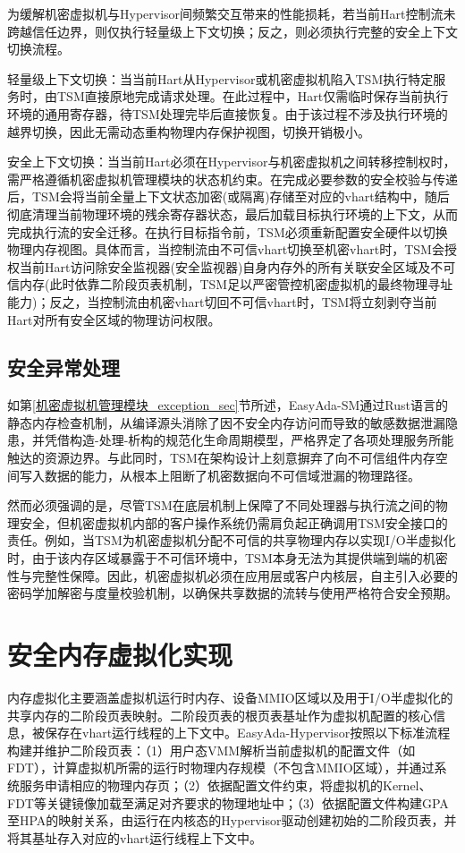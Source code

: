\documentclass[master, vlined, review]{DissertUESTC}
\begin{document}
	为缓解机密虚拟机与Hypervisor间频繁交互带来的性能损耗，若当前Hart控制流未跨越信任边界，则仅执行轻量级上下文切换；反之，则必须执行完整的安全上下文切换流程。
	
	轻量级上下文切换：当当前Hart从Hypervisor或机密虚拟机陷入TSM执行特定服务时，由TSM直接原地完成请求处理。在此过程中，Hart仅需临时保存当前执行环境的通用寄存器，待TSM处理完毕后直接恢复。由于该过程不涉及执行环境的越界切换，因此无需动态重构物理内存保护视图，切换开销极小。
	
	安全上下文切换：当当前Hart必须在Hypervisor与机密虚拟机之间转移控制权时，需严格遵循机密虚拟机管理模块的状态机约束。在完成必要参数的安全校验与传递后，TSM会将当前全量上下文状态加密(或隔离)存储至对应的vhart结构中，随后彻底清理当前物理环境的残余寄存器状态，最后加载目标执行环境的上下文，从而完成执行流的安全迁移。在执行目标指令前，TSM必须重新配置安全硬件以切换物理内存视图。具体而言，当控制流由不可信vhart切换至机密vhart时，TSM会授权当前Hart访问除安全监视器(安全监视器)自身内存外的所有关联安全区域及不可信内存(此时依靠二阶段页表机制，TSM足以严密管控机密虚拟机的最终物理寻址能力)；反之，当控制流由机密vhart切回不可信vhart时，TSM将立刻剥夺当前Hart对所有安全区域的物理访问权限。

	\subsection{安全异常处理}
	如第\ref{机密虚拟机管理模块_exception_sec}节所述，EasyAda-SM通过Rust语言的静态内存检查机制，从编译源头消除了因不安全内存访问而导致的敏感数据泄漏隐患，并凭借构造-处理-析构的规范化生命周期模型，严格界定了各项处理服务所能触达的资源边界。与此同时，TSM在架构设计上刻意摒弃了向不可信组件内存空间写入数据的能力，从根本上阻断了机密数据向不可信域泄漏的物理路径。
	
	然而必须强调的是，尽管TSM在底层机制上保障了不同处理器与执行流之间的物理安全，但机密虚拟机内部的客户操作系统仍需肩负起正确调用TSM安全接口的责任。例如，当TSM为机密虚拟机分配不可信的共享物理内存以实现I/O半虚拟化时，由于该内存区域暴露于不可信环境中，TSM本身无法为其提供端到端的机密性与完整性保障。因此，机密虚拟机必须在应用层或客户内核层，自主引入必要的密码学加解密与度量校验机制，以确保共享数据的流转与使用严格符合安全预期。
	
	\section{安全内存虚拟化实现}
	内存虚拟化主要涵盖虚拟机运行时内存、设备MMIO区域以及用于I/O半虚拟化的共享内存的二阶段页表映射。二阶段页表的根页表基址作为虚拟机配置的核心信息，被保存在vhart运行线程的上下文中。EasyAda-Hypervisor按照以下标准流程构建并维护二阶段页表：（1）用户态VMM解析当前虚拟机的配置文件（如FDT），计算虚拟机所需的运行时物理内存规模（不包含MMIO区域），并通过系统服务申请相应的物理内存页；（2）依据配置文件约束，将虚拟机的Kernel、FDT等关键镜像加载至满足对齐要求的物理地址中；（3）依据配置文件构建GPA至HPA的映射关系，由运行在内核态的Hypervisor驱动创建初始的二阶段页表，并将其基址存入对应的vhart运行线程上下文中。
	
\end{document}
